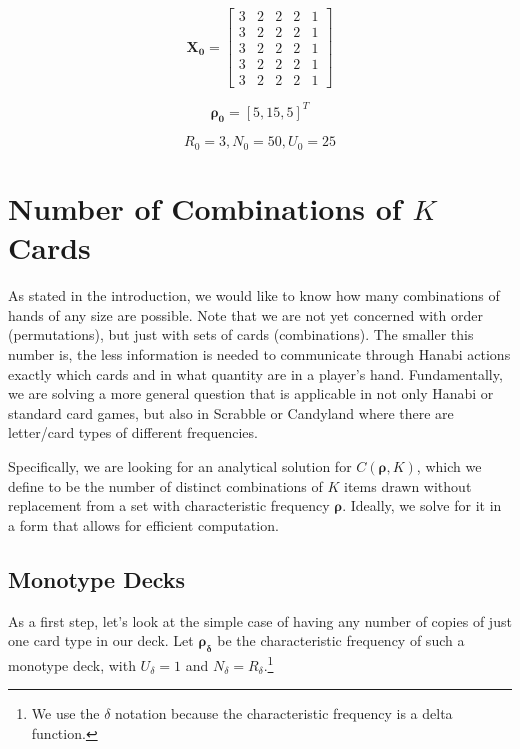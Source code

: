 \documentclass{article}
\begin{document}
\begin{equation}
    \bm{X_0} = \begin{bmatrix} 3 & 2 & 2 & 2 & 1\\3 & 2 & 2 & 2 & 1\\3 & 2 & 2 & 2 & 1\\3 & 2 & 2 & 2 & 1\\3 & 2 & 2 & 2 & 1
\end{bmatrix}
\end{equation}

\begin{equation}
    \bm{\rho_0} = [5, 15, 5]^T
\end{equation}

\begin{equation}
R_0 = 3, N_0 = 50, U_0 = 25
\end{equation}

\section{Number of Combinations of $K$ Cards}

As stated in the introduction, we would like to know how many combinations of hands of any size are possible. Note that we are not yet concerned with order (permutations), but just with sets of cards (combinations). The smaller this number is, the less information is needed to communicate through Hanabi actions exactly which cards and in what quantity are in a player's hand. Fundamentally, we are solving a more general question that is applicable in not only Hanabi or standard card games, but also in Scrabble or Candyland where there are letter/card types of different frequencies.

Specifically, we are looking for an analytical solution for $C(\bm{\rho}, K)$, which we define to be the number of distinct combinations of $K$ items drawn without replacement from a set with characteristic frequency $\bm{\rho}$. Ideally, we solve for it in a form that allows for efficient computation.

\subsection{Monotype Decks}

As a first step, let's look at the simple case of having any number of copies of just one card type in our deck. Let $\bm{\rho_{\delta}}$ be the characteristic frequency of such a monotype deck, with $U_{\delta} = 1$ and $N_{\delta} = R_{\delta}$.\footnote{We use the $\delta$ notation because the characteristic frequency is a delta function.}
\end{document}
